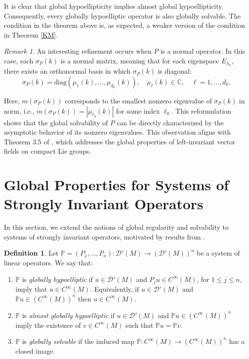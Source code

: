 \documentclass{amsart}
\theoremstyle{definition}
\newtheorem{definition}[theorem]{Definition}
\theoremstyle{remark}
\newtheorem{remark}[theorem]{Remark}
\numberwithin{equation}{section}
\begin{document}
	It is clear that global hypoellipticity implies almost global hypoellipticity. Consequently, every globally hypoelliptic operator is also globally solvable. The condition in the theorem above is, as expected, a weaker version of the condition in Theorem \ref{KM}.
	
	\begin{remark}
	An interesting refinement occurs when $P$ is a normal operator. In this case, each $\sigma_P(k)$ is a normal matrix, meaning that for each eigenspace $E_{\lambda_k}$, there exists an orthonormal basis in which $\sigma_P(k)$ is diagonal:
	\[
	\sigma_P(k) = \text{diag}(\mu_1(k),\dots,\mu_{d_k}(k)), \quad \mu_\ell(k)\in\mathbb{C}, \quad \ell=1,\dots,d_k.
	\]
	
	Here, $m(\sigma_P(k))$ corresponds to the smallest nonzero eigenvalue of $\sigma_P(k)$ in norm, i.e., $m(\sigma_P(k)) = |\mu_{\ell_0}(k)|$ for some index $\ell_0$. This reformulation shows that the global solvability of $P$ can be directly characterized by the asymptotic behavior of its nonzero eigenvalues. This observation aligns with Theorem 3.5 of \cite{KMR20b}, which addresses the global properties of left-invariant vector fields on compact Lie groups.
	\end{remark}
	
\section{Global Properties for Systems of Strongly Invariant Operators}

	In this section, we extend the notions of global regularity and solvability to systems of strongly invariant operators, motivated by results from \cite{AFR2022,AFR2024}. 
	
	\begin{definition}
		Let $\mathbb{P}=(P_1,\dots,P_n):\mathscr{D}'(M)\to (\mathscr{D}'(M))^n$ be a system of linear operators. We say that:
		\begin{enumerate}
			\item $\mathbb{P}$ is \textit{globally hypoelliptic} if $u\in\mathscr{D}'(M)$ and $P_j u\in C^\infty(M)$, for $1\leq j \leq n$, imply that $u\in C^\infty(M).$ Equivalently, if $u\in\mathscr{D}'(M)$ and $\mathbb{P}u\in (C^\infty(M))^n$ then $u\in C^\infty(M)$.  
			
			\item $\mathbb{P}$ is \textit{almost globally hypoelliptic} if $u\in\mathscr{D}'(M)$ and $\mathbb{P}u\in (C^\infty(M))^n$ imply the existence of $v\in C^\infty(M)$ such that $\mathbb{P}u=\mathbb{P}v.$ 
			
			\item $\mathbb{P}$ is \textit{globally solvable} if the induced map $\mathbb{P}:C^\infty(M)\to (C^\infty(M))^n$ has a closed image.
		\end{enumerate}
	\end{definition}
\end{document}
